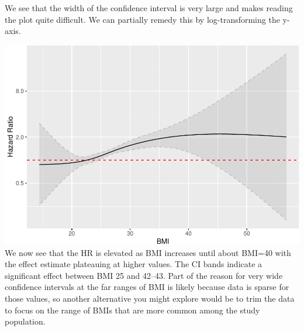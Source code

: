 \documentclass[
]{book}
\newenvironment{Shaded}{\begin{snugshade}}{\end{snugshade}}
\newcommand{\DataTypeTok}[1]{\textcolor[rgb]{0.13,0.29,0.53}{#1}}
\newcommand{\DecValTok}[1]{\textcolor[rgb]{0.00,0.00,0.81}{#1}}
\newcommand{\FloatTok}[1]{\textcolor[rgb]{0.00,0.00,0.81}{#1}}
\newcommand{\KeywordTok}[1]{\textcolor[rgb]{0.13,0.29,0.53}{\textbf{#1}}}
\newcommand{\NormalTok}[1]{#1}
\newcommand{\OperatorTok}[1]{\textcolor[rgb]{0.81,0.36,0.00}{\textbf{#1}}}
\newcommand{\StringTok}[1]{\textcolor[rgb]{0.31,0.60,0.02}{#1}}
\begin{document}
We see that the width of the confidence interval is very large and makes reading the plot quite difficult. We can partially remedy this by log-transforming the y-axis.

\begin{Shaded}
\end{Shaded}

\includegraphics{adv_epi_analysis_files/figure-latex/unnamed-chunk-246-1.pdf}
We now see that the HR is elevated as BMI increases until about BMI=40 with the effect estimate plateauing at higher values. The CI bands indicate a significant effect between BMI 25 and 42--43. Part of the reason for very wide confidence intervals at the far ranges of BMI is likely because data is sparse for those values, so another alternative you might explore would be to trim the data to focus on the range of BMIs that are more common among the study population.
\end{document}

